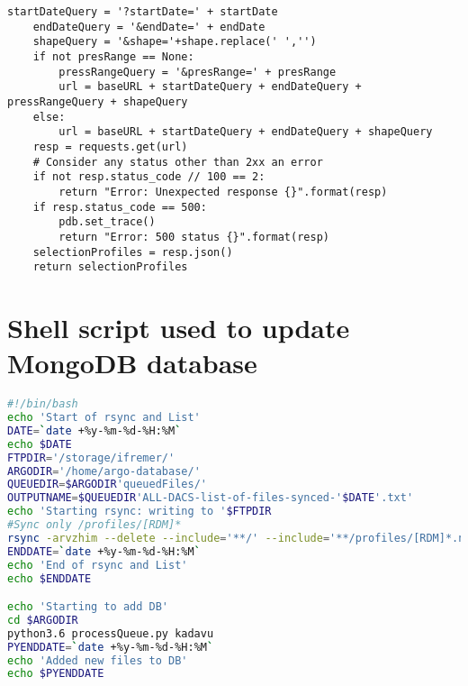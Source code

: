 \begin{lstlisting}[label={lst:api} caption=Python API to www.argovis.com]
    startDateQuery = '?startDate=' + startDate
    endDateQuery = '&endDate=' + endDate
    shapeQuery = '&shape='+shape.replace(' ','')
    if not presRange == None:
        pressRangeQuery = '&presRange=' + presRange
        url = baseURL + startDateQuery + endDateQuery + pressRangeQuery + shapeQuery
    else:
        url = baseURL + startDateQuery + endDateQuery + shapeQuery
    resp = requests.get(url)
    # Consider any status other than 2xx an error
    if not resp.status_code // 100 == 2:
        return "Error: Unexpected response {}".format(resp)
    if resp.status_code == 500:
        pdb.set_trace()
        return "Error: 500 status {}".format(resp)
    selectionProfiles = resp.json()
    return selectionProfiles
\end{lstlisting}

\chapter{Shell script used to update MongoDB database}\label{append:update_db}

\begin{lstlisting}[language=bash, label={lst:cron}, caption=bash script used to syncronize local mirror of vdmzrs.ifremer.fr::argo. Python code updates MongoDB with changes.]
#!/bin/bash
echo 'Start of rsync and List'
DATE=`date +%y-%m-%d-%H:%M`
echo $DATE
FTPDIR='/storage/ifremer/'
ARGODIR='/home/argo-database/'
QUEUEDIR=$ARGODIR'queuedFiles/'
OUTPUTNAME=$QUEUEDIR'ALL-DACS-list-of-files-synced-'$DATE'.txt'
echo 'Starting rsync: writing to '$FTPDIR
#Sync only /profiles/[RDM]*
rsync -arvzhim --delete --include='**/' --include='**/profiles/[RDM]*.nc' --exclude='*' --exclude='**/profiles/B*' vdmzrs.ifremer.fr::argo $FTPDIR > $OUTPUTNAME
ENDDATE=`date +%y-%m-%d-%H:%M`
echo 'End of rsync and List'
echo $ENDDATE

echo 'Starting to add DB'
cd $ARGODIR
python3.6 processQueue.py kadavu
PYENDDATE=`date +%y-%m-%d-%H:%M`
echo 'Added new files to DB'
echo $PYENDDATE
\end{lstlisting}